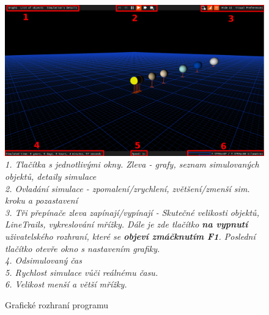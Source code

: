 \begin{landscape}
\begin{figure}[ht]
	\caption{Grafické rozhraní programu}
	\centering
	\includegraphics[width=\linewidth,keepaspectratio]{Figs/Overview}\\
	\textit{1. Tlačítka s jednotlivými okny. Zleva - grafy, seznam simulovaných objektů, detaily simulace}\\
	\textit{2. Ovladání simulace - zpomalení/zrychlení, zvětšení/zmenší sim. kroku a pozastavení}\\
	\textit{3. Tři přepínače zleva zapínají/vypínají - Skutečné velikosti objektů, LineTrails, vykreslování mřížky. Dále je zde tlačítko \textbf{na vypnutí} uživatelského rozhraní, které se \textbf{objeví zmáčknutím F1}. Poslední tlačítko otevře okno s nastavením grafiky. }\\
	\textit{4. Odsimulovaný čas \\ 5. Rychlost simulace vůči reálnému času.}\\
	\textit{6. Velikost menší a větší mřížky.}
\end{figure}


\end{landscape}
